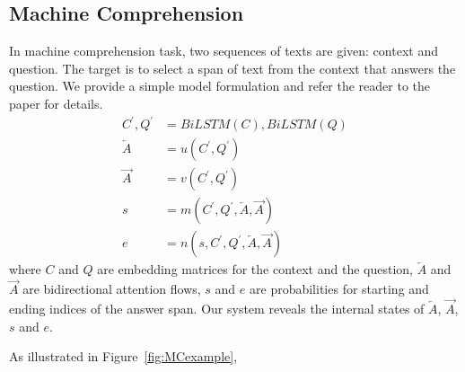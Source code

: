 \subsection{Machine Comprehension}
In machine comprehension task, two sequences of texts are given: context and question.
The target is to select a span of text from the context that answers the question. We provide a simple model
formulation and refer the reader to the paper for details.
\begin{align}
	C^\prime, Q^\prime &= BiLSTM(C), BiLSTM(Q)\\
	\overleftarrow{A} &= u(C^\prime, Q^\prime)\\
	\overrightarrow{A} &= v(C^\prime, Q^\prime)\\
	s &= m(C^\prime, Q^\prime, \overleftarrow{A}, \overrightarrow{A})\\
	e &= n(s, C^\prime, Q^\prime, \overleftarrow{A}, \overrightarrow{A})
\end{align}
where $C$ and $Q$ are embedding matrices for the context and the question,
$\overleftarrow{A}$ and $\overrightarrow{A}$ are bidirectional attention flows,
$s$ and $e$ are probabilities for starting and ending indices of the answer span.
Our system reveals the internal states of $\overleftarrow{A}$, $\overrightarrow{A}$,
$s$ and $e$.

As illustrated in Figure~\ref{fig:MCexample},
